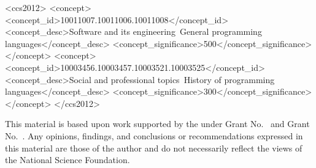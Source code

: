 \documentclass[acmsmall,review,anonymous]{acmart}\settopmatter{printfolios=true,printccs=false,printacmref=false}
\begin{document}


\begin{CCSXML}
<ccs2012>
<concept>
<concept_id>10011007.10011006.10011008</concept_id>
<concept_desc>Software and its engineering~General programming languages</concept_desc>
<concept_significance>500</concept_significance>
</concept>
<concept>
<concept_id>10003456.10003457.10003521.10003525</concept_id>
<concept_desc>Social and professional topics~History of programming languages</concept_desc>
<concept_significance>300</concept_significance>
</concept>
</ccs2012>
\end{CCSXML}






\maketitle









\begin{acks}                            %
  This material is based upon work supported by the
   under Grant
  No.~ and Grant
  No.~.  Any opinions, findings, and
  conclusions or recommendations expressed in this material are those
  of the author and do not necessarily reflect the views of the
  National Science Foundation.
\end{acks}


%



\end{document}
